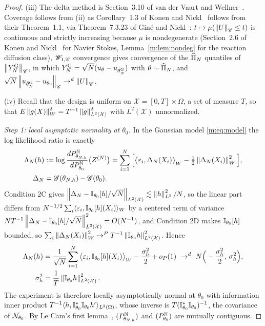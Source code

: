 \begin{proof}
(iii) The delta method is Section~3.10 of van der Vaart and Wellner~\cite{vandervaartwellner2023}. Coverage follows from (ii) as Corollary~1.3 of Konen and Nickl~\cite{konennickl2026} follows from their Theorem~1.1, via Theorem~7.3.23 of Gin\'e and Nickl~\cite{ginenickl2016}: $t\mapsto\mu(\left\|U\right\|_{\mathscr{C}}\le t)$ is continuous and strictly increasing because $\mu$ is nondegenerate (Section~2.6 of Konen and Nickl~\cite{konennickl2026} for Navier Stokes, Lemma~\ref{m:lem:nondeg} for the reaction diffusion class), $\mathscr{W}_{1,\mathscr{C}}$ convergence gives convergence of the $\widehat\Pi_N$ quantiles of $\left\|Y^{\rm G}_N\right\|_{\mathscr{C}}$, in which $Y^{\rm G}_N=\sqrt N(u_\theta-u_{\hat\theta^{\rm G}_N})$ with $\theta\sim\widehat\Pi_N$, and $\sqrt N\left\|u_{\hat\theta^{\rm G}_N}-u_{\theta_0}\right\|_{\mathscr{C}}\to^d\left\|U\right\|_{\mathscr{C}}$.

(iv) Recall that the design is uniform on $\mathcal X=[0,T]\times\Omega$, a set of measure $T$, so that $E\left\|g(X)\right\|^2_W=T^{-1}\left\|g\right\|^2_{L^2(\mathcal X)}$ with $L^2(\mathcal X)$ unnormalized.

\emph{Step 1: local asymptotic normality at $\theta_0$.} In the Gaussian model \eqref{m:eq:model} the log likelihood ratio is exactly
\[
\begin{aligned}
\Lambda_N(h)&:=\log\frac{dP^{\mathbb{N}}_{\theta_{N,h}}}{dP^{\mathbb{N}}_{\theta_0}}\big(Z^{(N)}\big)=\sum_{i=1}^N\Big[\big\langle\varepsilon_i,\Delta_N(X_i)\big\rangle_W-\tfrac12\left\|\Delta_N(X_i)\right\|^2_W\Big],\\
\Delta_N&=\mathscr{G}(\theta_{N,h})-\mathscr{G}(\theta_0).
\end{aligned}
\]
Condition 2C gives $\left\|\Delta_N-\mathbb{I}_{\theta_0}[h]/\sqrt N\right\|_{L^2(\mathcal X)}\lesssim\left\|h\right\|^2_{L^2}/N$, so the linear part differs from $N^{-1/2}\sum_i\langle\varepsilon_i,\mathbb{I}_{\theta_0}[h](X_i)\rangle_W$ by a centered term of variance $NT^{-1}\left\|\Delta_N-\mathbb{I}_{\theta_0}[h]/\sqrt N\right\|^2_{L^2(\mathcal X)}=O(N^{-1})$, and Condition 2D makes $\mathbb{I}_{\theta_0}[h]$ bounded, so $\sum_i\left\|\Delta_N(X_i)\right\|^2_W\to^PT^{-1}\left\|\mathbb{I}_{\theta_0}h\right\|^2_{L^2(\mathcal X)}$. Hence
\[
\begin{aligned}
\Lambda_N(h)&=\frac1{\sqrt N}\sum_{i=1}^N\big\langle\varepsilon_i,\I_{\theta_0}[h](X_i)\big\rangle_W-\frac{\sigma^2_h}{2}+o_P(1)\ \to^d\ N\Big(-\frac{\sigma^2_h}{2},\,\sigma^2_h\Big),\\
\sigma^2_h&=\frac1T\norm{\I_{\theta_0}h}^2_{L^2(\mathcal X)} .
\end{aligned}
\]
The experiment is therefore locally asymptotically normal at $\theta_0$ with information inner product $T^{-1}\langle h,\mathbb{I}^*_{\theta_0}\mathbb{I}_{\theta_0}h'\rangle_{L^2(\Omega)}$, whose inverse is $T(\mathbb{I}^*_{\theta_0}\mathbb{I}_{\theta_0})^{-1}$, the covariance of $\mathcal{N}_{\theta_0}$. By Le Cam's first lemma~\cite[Section~6.2]{vandervaart1998}, $(P^{\mathbb{N}}_{\theta_{N,h}})$ and $(P^{\mathbb{N}}_{\theta_0})$ are mutually contiguous.


\end{proof}

